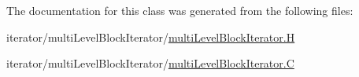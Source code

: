 The documentation for this class was generated from the following files:\begin{DoxyCompactItemize}
\item 
iterator/multiLevelBlockIterator/\hyperlink{multiLevelBlockIterator_8H}{multiLevelBlockIterator.H}\item 
iterator/multiLevelBlockIterator/\hyperlink{multiLevelBlockIterator_8C}{multiLevelBlockIterator.C}\end{DoxyCompactItemize}
